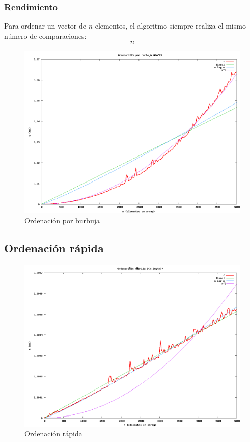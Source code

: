 \subsubsection{Rendimiento}
Para ordenar un vector de $n$ elementos, el algoritmo siempre realiza el mismo número de comparaciones:
\[n\]
	\begin{figure}[H]
	  \centering
	    \includegraphics[width=1.0\textwidth]{bubble-sort.png}
	  \caption{Ordenación por burbuja}
	  \label{fig:bubble}
	\end{figure}

\subsection{Ordenación r\'apida}

	\begin{figure}[H]
  		\centering
   	 	\includegraphics[width=1.0\textwidth]{quick-sort.png}
  		\caption{Ordenación rápida}
  		\label{fig:quick}
	\end{figure}
